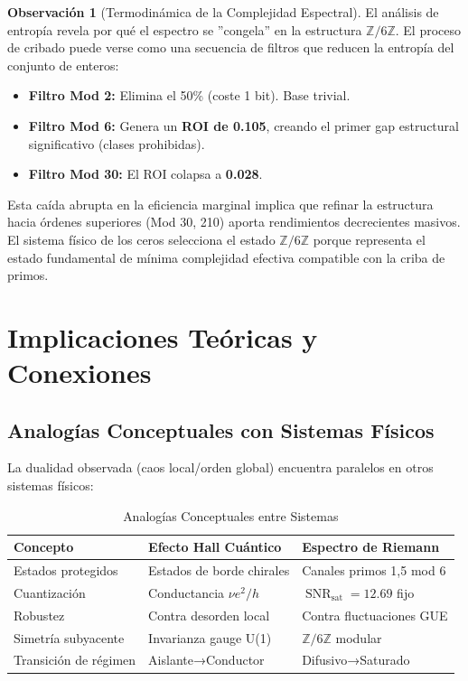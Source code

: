 \documentclass[12pt, a4paper]{article}
\theoremstyle{plain}
\theoremstyle{definition}
\newtheorem{observacion}[teorema]{Observación}
\newcommand{\Z}{\mathbb{Z}}
\newcommand{\SNR}{\operatorname{SNR}}
\begin{document}
\begin{observacion}[Termodinámica de la Complejidad Espectral]
El análisis de entropía revela por qué el espectro se ''congela'' en la estructura $\Z/6\Z$. El proceso de cribado puede verse como una secuencia de filtros que reducen la entropía del conjunto de enteros:
\begin{itemize}
    \item \textbf{Filtro Mod 2:} Elimina el 50\% (coste 1 bit). Base trivial.
    \item \textbf{Filtro Mod 6:} Genera un \textbf{ROI de 0.105}, creando el primer gap estructural significativo (clases prohibidas).
    \item \textbf{Filtro Mod 30:} El ROI colapsa a \textbf{0.028}.
\end{itemize}
Esta caída abrupta en la eficiencia marginal implica que refinar la estructura hacia órdenes superiores (Mod 30, 210) aporta rendimientos decrecientes masivos. El sistema físico de los ceros selecciona el estado $\Z/6\Z$ porque representa el estado fundamental de mínima complejidad efectiva compatible con la criba de primos.
\end{observacion}

\section{Implicaciones Teóricas y Conexiones}

\subsection{Analogías Conceptuales con Sistemas Físicos}

La dualidad observada (caos local/orden global) encuentra paralelos en otros sistemas físicos:

\begin{table}[H]
\centering
\caption{Analogías Conceptuales entre Sistemas}
\label{tab:analogias}
\begin{tabular}{@{}lll@{}}
\toprule
\textbf{Concepto} & \textbf{Efecto Hall Cuántico} & \textbf{Espectro de Riemann} \\
\midrule
Estados protegidos & Estados de borde chirales & Canales primos 1,5 mod 6 \\
Cuantización & Conductancia $\nu e^2/h$ & $\SNR_{\text{sat}} = 12.69$ fijo \\
Robustez & Contra desorden local & Contra fluctuaciones GUE \\
Simetría subyacente & Invarianza gauge U(1) & $\Z/6\Z$ modular \\
Transición de régimen & Aislante→Conductor & Difusivo→Saturado \\
\bottomrule
\end{tabular}
\end{table}
\end{document}
